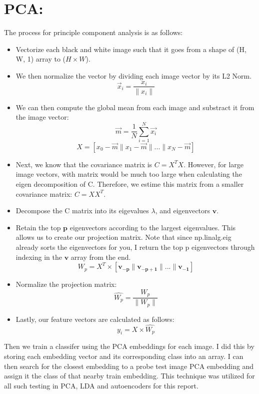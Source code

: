 \documentclass{article}
\begin{document}
\section{PCA:}
The process for principle component analysis is as follows:
\begin{itemize}
    \item Vectorize each black and white image such that it goes from a shape of (H, W, 1) array to ($H\times W$).
    \item We then normalize the vector by dividing each image vector by its L2 Norm.
        \[\vec{x}_i = \frac{x_i}{\| x_i \|}\]
    
    \item We can then compute the global mean from each image and substract it from the image vector:
        \[\vec{m} = \frac{1}{N} \sum_{i=1}^{N} \vec{x_i}\]
        \[X = \left[ x_0 - \vec{m} \| x_1 - \vec{m} \| ... \| x_N - \vec{m}\right]\]
    
    \item Next, we know that the covariance matrix is \(C = X^T X\). However, for large image vectors, with matrix would be much too large when calculating the eigen decomposition of C. Therefore, we estime this matrix from a smaller covariance matrix: \(C = X X^T\).
    \item Decompose the C matrix into its eigevalues $\lambda$, and eigenvectors $\boldsymbol{v}$.
    \item Retain the top $\boldsymbol{p}$ eigenvectors according to the largest eigenvalues. This allows us to create our projection matrix. Note that since np.linalg.eig already sorts the eigenvectors for you, I return the top p eigenvectors through indexing in the $\boldsymbol{v}$ array from the end.
        \[W_p = X^T \times \left[\boldsymbol{v_{-p}} \| \boldsymbol{v_{-p + 1}} \| ... \| \boldsymbol{v_{-1}}\right]\]
    \item Normalize the projection matrix:
        \[\hat{W_p} = \frac{W_p}{\| W_p \|}\]
    \item Lastly, our feature vectors are calculated as follows:
        \[y_i = X \times \hat{W_p}\]
\end{itemize}

Then we train a classifer using the PCA embeddings for each image. I did this by storing each embedding vector and its corresponding class into an array. I can then search for the closest embedding to a probe test image PCA embedding and assign it the class of that nearby train embedding. This technique was utilized for all such testing in PCA, LDA and autoencoders for this report.
\end{document}
